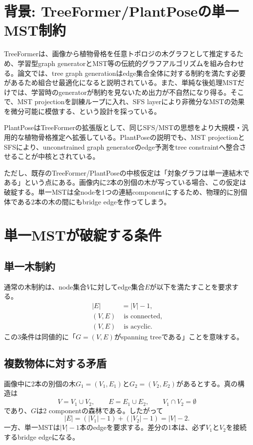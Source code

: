 \documentclass[11pt,a4paper]{article}
\begin{document}
\section{背景: TreeFormer/PlantPoseの単一MST制約}
TreeFormerは、画像から植物骨格を任意トポロジの木グラフとして推定するため、学習型graph generatorとMST等の伝統的グラフアルゴリズムを組み合わせる。論文では、tree graph generationはedge集合全体に対する制約を満たす必要があるため組合せ最適化になると説明されている。また、単純な後処理MSTだけでは、学習時のgeneratorが制約を見ないため出力が不自然になり得る。そこで、MST projectionを訓練ループに入れ、SFS layerにより非微分なMSTの効果を微分可能に模倣する、という設計を採っている\cite{treeformer2025,plantpose2026}。

PlantPoseはTreeFormerの拡張版として、同じSFS/MSTの思想をより大規模・汎用的な植物骨格推定へ拡張している。PlantPoseの説明でも、MST projectionとSFSにより、unconstrained graph generatorのedge予測をtree constraintへ整合させることが中核とされている\cite{plantpose2026}。

ただし、既存のTreeFormer/PlantPoseの中核仮定は「対象グラフは単一連結木である」という点にある。画像内に2本の別個の木が写っている場合、この仮定は破綻する。単一MSTは全nodeを1つの連結componentにするため、物理的に別個体である2本の木の間にもbridge edgeを作ってしまう。

\section{単一MSTが破綻する条件}
\subsection{単一木制約}
通常の木制約は、node集合$V$に対してedge集合$E$が以下を満たすことを要求する。
\begin{align}
  |E| &= |V|-1, \\
  (V,E) &\text{ is connected}, \\
  (V,E) &\text{ is acyclic}.
\end{align}
この3条件は同値的に「$G=(V,E)$がspanning treeである」ことを意味する。

\subsection{複数物体に対する矛盾}
画像中に2本の別個の木$G_1=(V_1,E_1)$と$G_2=(V_2,E_2)$があるとする。真の構造は
\begin{equation}
  V=V_1\cup V_2,
  \qquad
  E=E_1\cup E_2,
  \qquad
  V_1\cap V_2=\emptyset
\end{equation}
であり、$G$は2 componentの森林である。したがって
\begin{equation}
  |E|=(|V_1|-1)+(|V_2|-1)=|V|-2.
\end{equation}
一方、単一MSTは$|V|-1$本のedgeを要求する。差分の1本は、必ず$V_1$と$V_2$を接続するbridge edgeになる。
\end{document}
